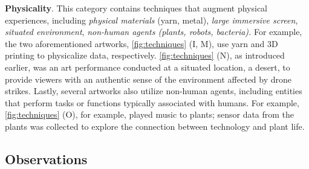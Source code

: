 \textbf{Physicality}. This category contains techniques that augment physical experiences, including \textit{physical materials} (\eg yarn, metal), \textit{large immersive screen}, \textit{situated environment}, 
\textit{non-human agents (\eg \textit{plants}, \textit{robots}, \textit{bacteria}).}
For example, the two aforementioned artworks, \autoref{fig:techniques} (I, M), use yarn and 3D printing to physicalize data, respectively.
\autoref{fig:techniques} (N), as introduced earlier, was an art performance conducted at a situated location, a desert, to provide viewers with an authentic sense of the environment affected by drone strikes.
Lastly, several artworks also utilize non-human agents, including entities that perform tasks or functions typically associated with humans. For example, \autoref{fig:techniques} (O), for example, played music to plants; sensor data from the plants was collected to explore the connection between technology and plant life.

\subsection{Observations}

